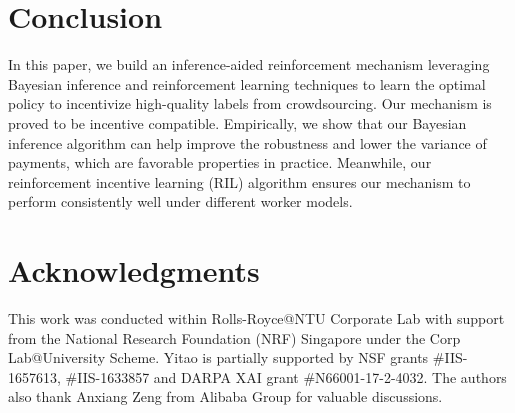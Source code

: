 \documentclass{article}
\newcommand{\com}[1]{\textbf{\color{red}(COMMENT: #1)}} %
\newcommand{\com}[1]{}
\begin{document}

\section{Conclusion}
In this paper, we build an inference-aided reinforcement mechanism leveraging Bayesian inference and reinforcement learning techniques to learn the optimal policy to incentivize high-quality labels from crowdsourcing. Our mechanism is proved to be incentive compatible. Empirically, we show that our Bayesian inference algorithm can help improve the robustness and lower the variance of payments, which are favorable properties in practice.
Meanwhile, our reinforcement incentive learning (RIL) algorithm ensures our mechanism to perform consistently well under different worker models.

\section*{Acknowledgments}
This work was conducted within Rolls-Royce@NTU Corporate Lab
with support from the National Research Foundation (NRF) Singapore
under the Corp Lab@University Scheme. Yitao is partially supported by NSF grants \#IIS-1657613, \#IIS-1633857 and DARPA XAI grant \#N66001-17-2-4032. The authors also thank Anxiang Zeng from Alibaba Group for valuable discussions.


\end{document}
